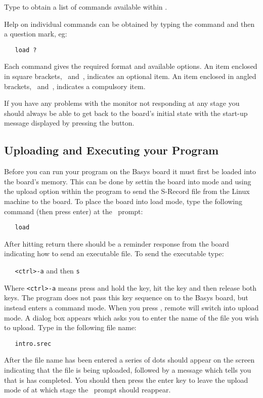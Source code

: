 Type  to obtain a list of commands available within \WRAMPmon.

Help on individual commands can be obtained by typing the command and then a 
question mark, eg:
\begin{verbatim}
   load ?
\end{verbatim}

Each command gives the required format and available options.
An item enclosed in square brackets, \src{[}~and~\src{]},
indicates an optional item. An item enclosed in angled brackets, 
\src{<}~and~\src{>}, indicates a compulsory item.

If you have any problems with the monitor not responding at any stage you 
should always be able to get back to the board's initial state with the
start-up message displayed by pressing the  button.

\subsection{Uploading and Executing your Program}
Before you can run your program on the Basys board it must first be loaded
into the board's memory. This can be done by settin the board into 
mode and using the upload option within the  program to send
the S-Record file from the Linux machine to the board. To place the board
into load mode, type the following command (then press enter) at the
\WRAMPmon\ prompt:
\begin{verbatim}
   load
\end{verbatim}

After hitting return there should be a reminder response from the board indicating 
how to send an executable file. To send the executable type:

\verb|   <ctrl>-a| and then \verb|s|

Where \verb|<ctrl>-a| means press and hold the  key, hit 
the  key and then release both keys.
The  program does not pass this key sequence on to the Basys 
board, but instead enters a command mode. When you press , remote will
switch into upload mode. A dialog box appears which asks you to enter the name
of the file you wish to upload. Type in the following file name:
\begin{verbatim}
   intro.srec
\end{verbatim}

After the file name has been entered a series of dots should appear on the 
screen indicating that the file is being uploaded, followed by a message which
tells you that is has completed. You should then press the enter key to
leave the upload mode of  at which stage the \WRAMPmon\ prompt 
should reappear.

